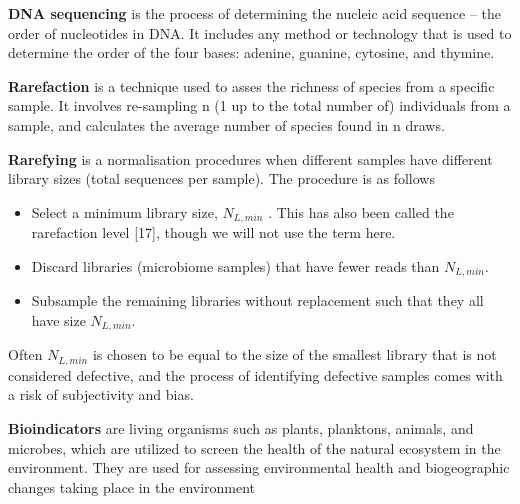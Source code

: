 \textbf{DNA sequencing }is the process of determining the nucleic acid sequence – the order of nucleotides in DNA. It includes any method or technology that is used to determine the order of the four bases: adenine, guanine, cytosine, and thymine.

\textbf{Rarefaction} is a technique used to asses the richness of species from a specific sample. It involves re-sampling n (1 up to the total number of) individuals from a sample, and calculates the average number of species found in n draws. 

\textbf{Rarefying} is a normalisation procedures when different samples have different library sizes (total sequences per sample). The procedure is as follows

\begin{itemize}
    \item Select a minimum library size, $N_{L,min}$ . This has also been called the rarefaction level [17], though we will not use the term here.
    \item Discard libraries (microbiome samples) that have fewer reads than  $N_{L,min}$.
    \item Subsample the remaining libraries without replacement such that they all have size  $N_{L,min}$.
\end{itemize}

Often  $N_{L,min}$ is chosen to be equal to the size of the smallest library that is not considered defective, and the process of identifying defective samples comes with a risk of subjectivity and bias. \cite{inadmissible_rareying}




\textbf{Bioindicators} are living organisms such as plants, planktons, animals, and microbes, which are utilized to screen the health of the natural ecosystem in the environment. They are used for assessing environmental health and biogeographic changes taking place in the environment









